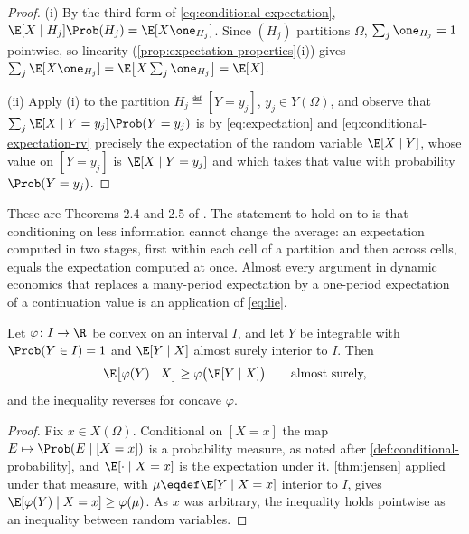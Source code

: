 \begin{proof}
	(i) By the third form of \eqref{eq:conditional-expectation},
	$\E[X\mid H_j]\Prob(H_j)=\E[X\one_{H_j}]$. Since $(H_j)$ partitions $\Omega$,
	$\sum_j\one_{H_j}=1$ pointwise, so linearity
	(\autoref{prop:expectation-properties}(i)) gives
	$\sum_j\E[X\one_{H_j}]=\E\bigl[X\sum_j\one_{H_j}\bigr]=\E[X]$.

	(ii) Apply (i) to the partition $H_j\eqdef[Y=y_j]$, $y_j\in Y(\Omega)$, and
	observe that $\sum_j\E[X\mid Y=y_j]\Prob(Y=y_j)$ is by
	\eqref{eq:expectation} and \eqref{eq:conditional-expectation-rv} precisely the
	expectation of the random variable $\E[X\mid Y]$, whose value on $[Y=y_j]$ is
	$\E[X\mid Y=y_j]$ and which takes that value with probability
	$\Prob(Y=y_j)$.
\end{proof}

These are Theorems 2.4 and 2.5 of \textcite[pp.~74--75]{fukuda2026notes}
\autocite[slides 18--19]{fukuda2026probability}. The statement to hold on to is
that conditioning on less information cannot change the average: an expectation
computed in two stages, first within each cell of a partition and then across
cells, equals the expectation computed at once. Almost every argument in dynamic
economics that replaces a many-period expectation by a one-period expectation of
a continuation value is an application of \eqref{eq:lie}.

\begin{proposition}\label{prop:conditional-jensen}
	Let $\varphi\colon I\to\R$ be convex on an interval $I$, and let $Y$ be
	integrable with $\Prob(Y\in I)=1$ and $\E[Y\mid X]$ almost surely interior to
	$I$. Then
	\begin{equation}\label{eq:conditional-jensen}
		\E\bigl[\varphi(Y)\mid X\bigr]\geq\varphi\bigl(\E[Y\mid X]\bigr)
		\qquad\text{almost surely,}
	\end{equation}
	and the inequality reverses for concave $\varphi$.
\end{proposition}

\begin{proof}
	Fix $x\in X(\Omega)$. Conditional on $[X=x]$ the map
	$E\mapsto\Prob(E\mid[X=x])$ is a probability measure, as noted after
	\autoref{def:conditional-probability}, and $\E[\cdot\mid X=x]$ is the
	expectation under it. \autoref{thm:jensen} applied under that measure, with
	$\mu\eqdef\E[Y\mid X=x]$ interior to $I$, gives
	$\E[\varphi(Y)\mid X=x]\geq\varphi(\mu)$. As $x$ was arbitrary, the inequality
	holds pointwise as an inequality between random variables.
\end{proof}


